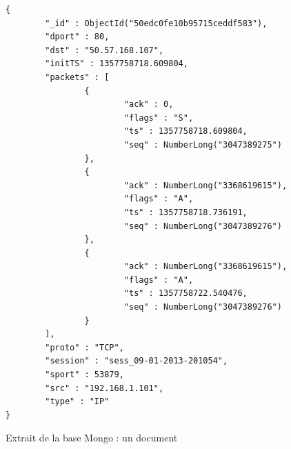 \begin{figure}[h!]
\centering
\begin{verbatim}
{
        "_id" : ObjectId("50edc0fe10b95715ceddf583"),
        "dport" : 80,
        "dst" : "50.57.168.107",
        "initTS" : 1357758718.609804,
        "packets" : [
                {
                        "ack" : 0,
                        "flags" : "S",
                        "ts" : 1357758718.609804,
                        "seq" : NumberLong("3047389275")
                },
                {
                        "ack" : NumberLong("3368619615"),
                        "flags" : "A",
                        "ts" : 1357758718.736191,
                        "seq" : NumberLong("3047389276")
                },
                {
                        "ack" : NumberLong("3368619615"),
                        "flags" : "A",
                        "ts" : 1357758722.540476,
                        "seq" : NumberLong("3047389276")
                }
        ],
        "proto" : "TCP",
        "session" : "sess_09-01-2013-201054",
        "sport" : 53879,
        "src" : "192.168.1.101",
        "type" : "IP"
}

\end{verbatim}
\caption{Extrait de la base Mongo : un document}
\end{figure}

